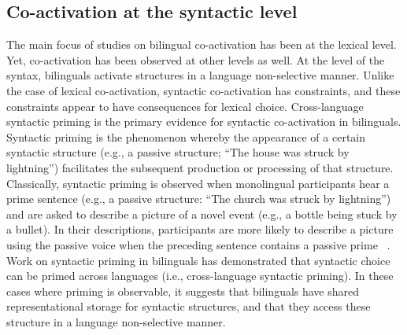 \subsection{Co-activation at the syntactic level}
\label{co-activationatthesyntacticlevel}

The main focus of studies on bilingual co-activation has been at the lexical level. Yet, co-activation has been observed at other levels as well. At the level of the syntax, bilinguals activate structures in a language non-selective manner. Unlike the case of lexical co-activation, syntactic co-activation has constraints, and these constraints appear to have consequences for lexical choice. Cross-language syntactic priming is the primary evidence for syntactic co-activation in bilinguals. Syntactic priming is the phenomenon whereby the appearance of a certain syntactic structure (e.g., a passive structure; ``The house was struck by lightning'') facilitates the subsequent production or processing of that structure. Classically, syntactic priming is observed when monolingual participants hear a prime sentence (e.g., a passive structure: ``The church was struck by lightning'') and are asked to describe a picture of a novel event (e.g., a bottle being stuck by a bullet). In their descriptions, participants are more likely to describe a picture using the passive voice when the preceding sentence contains a passive prime ~\citep{Bock1986}. Work on syntactic priming in bilinguals has demonstrated that syntactic choice can be primed across languages (i.e., cross-language syntactic priming). In these cases where priming is observable, it suggests that bilinguals have shared representational storage for syntactic structures, and that they access these structure in a language non-selective manner. 

